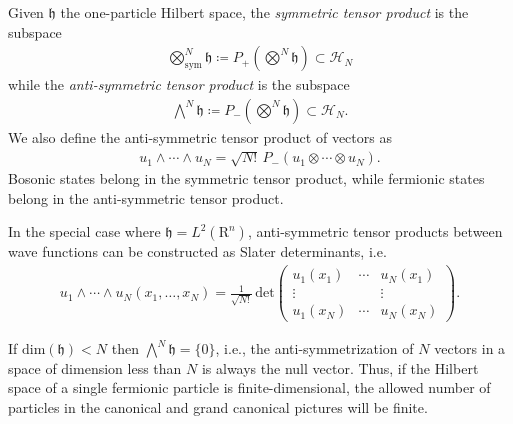 \begin{definition}
	Given $\mathfrak{h}$ the one-particle Hilbert space, the \textit{symmetric tensor product}
	is the subspace
	\begin{align*}
		\bigotimes_{\mathrm{sym}}^N\mathfrak{h} \coloneq P_+ \left( \bigotimes^N\mathfrak{h} \right) \subset \mathcal{H}_N
	\end{align*}
	while the \textit{anti-symmetric tensor product} is the subspace
	\begin{align*}
		\bigwedge^N\mathfrak{h} \coloneq P_- \left( \bigotimes^N\mathfrak{h} \right) \subset \mathcal{H}_N.
	\end{align*}
	We also define the anti-symmetric tensor product of vectors as
	\begin{align*}
		u_1 \wedge \cdots \wedge u_N = \sqrt{N!}\, P_- (u_1 \otimes \cdots \otimes u_N).
	\end{align*}
	Bosonic states belong in the symmetric tensor product, while fermionic states belong in
	the anti-symmetric tensor product.
\end{definition}

\begin{remark}
	In the special case where $\mathfrak{h} = L^2(\mathrm{R}^n)$, anti-symmetric tensor
	products between wave functions can be constructed as Slater determinants, i.e.
	\begin{align*}
		u_1 \wedge \cdots \wedge u_N (x_1, \ldots, x_N) = \frac{1}{\sqrt{N!}} \,\mathrm{det}
		\begin{pmatrix}
			u_1(x_1) & \cdots & u_N(x_1) \\
			\vdots   &        & \vdots   \\
			u_1(x_N) & \cdots & u_N(x_N)
		\end{pmatrix}.
	\end{align*}
\end{remark}

\begin{remark}
	If $\mathrm{dim}(\mathfrak{h}) < N$ then $\bigwedge^N\mathfrak{h} = \{0\}$,
	i.e., the anti-symmetrization of $N$ vectors in a space of dimension less than $N$ is always
	the null vector. Thus, if the Hilbert space of a single fermionic particle is
	finite-dimensional, the allowed number of particles in the canonical and grand canonical
	pictures will be finite.
\end{remark}

